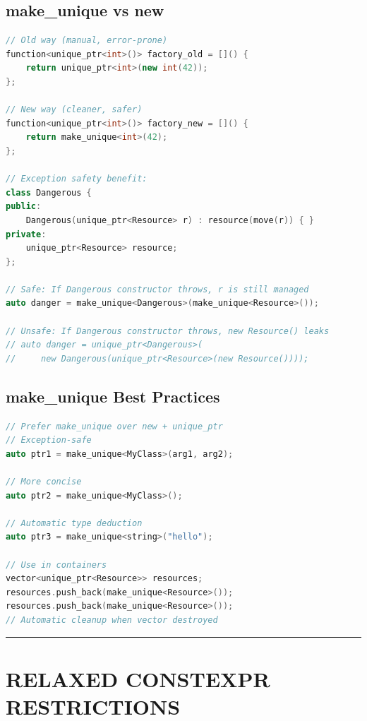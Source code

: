 \hypertarget{make_unique-vs-new}{%
\subsection{make\_unique vs new}\label{make_unique-vs-new}}

\begin{lstlisting}[language={C++}]
// Old way (manual, error-prone)
function<unique_ptr<int>()> factory_old = []() {
    return unique_ptr<int>(new int(42));
};

// New way (cleaner, safer)
function<unique_ptr<int>()> factory_new = []() {
    return make_unique<int>(42);
};

// Exception safety benefit:
class Dangerous {
public:
    Dangerous(unique_ptr<Resource> r) : resource(move(r)) { }
private:
    unique_ptr<Resource> resource;
};

// Safe: If Dangerous constructor throws, r is still managed
auto danger = make_unique<Dangerous>(make_unique<Resource>());

// Unsafe: If Dangerous constructor throws, new Resource() leaks
// auto danger = unique_ptr<Dangerous>(
//     new Dangerous(unique_ptr<Resource>(new Resource())));
\end{lstlisting}

\hypertarget{make_unique-best-practices}{%
\subsection{make\_unique Best
Practices}\label{make_unique-best-practices}}

\begin{lstlisting}[language={C++}]
// Prefer make_unique over new + unique_ptr
// Exception-safe
auto ptr1 = make_unique<MyClass>(arg1, arg2);

// More concise
auto ptr2 = make_unique<MyClass>();

// Automatic type deduction
auto ptr3 = make_unique<string>("hello");

// Use in containers
vector<unique_ptr<Resource>> resources;
resources.push_back(make_unique<Resource>());
resources.push_back(make_unique<Resource>());
// Automatic cleanup when vector destroyed
\end{lstlisting}

\begin{center}\rule{0.5\linewidth}{0.5pt}\end{center}

\hypertarget{relaxed-constexpr-restrictions}{%
\section{RELAXED CONSTEXPR
RESTRICTIONS}\label{relaxed-constexpr-restrictions}}


